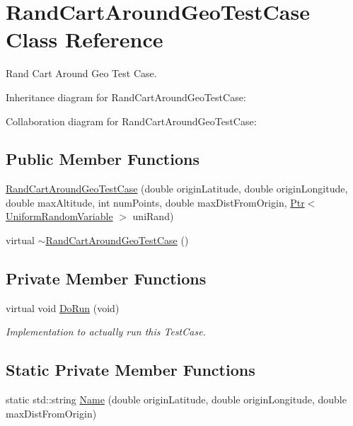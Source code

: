 \hypertarget{classRandCartAroundGeoTestCase}{}\section{Rand\+Cart\+Around\+Geo\+Test\+Case Class Reference}
\label{classRandCartAroundGeoTestCase}


Rand Cart Around Geo Test Case.  




Inheritance diagram for Rand\+Cart\+Around\+Geo\+Test\+Case\+:


Collaboration diagram for Rand\+Cart\+Around\+Geo\+Test\+Case\+:
\subsection*{Public Member Functions}
\begin{DoxyCompactItemize}
\item 
\hyperlink{classRandCartAroundGeoTestCase_ac9eab7c26bb248769d9d781c83065957}{Rand\+Cart\+Around\+Geo\+Test\+Case} (double origin\+Latitude, double origin\+Longitude, double max\+Altitude, int num\+Points, double max\+Dist\+From\+Origin, \hyperlink{classns3_1_1Ptr}{Ptr}$<$ \hyperlink{classns3_1_1UniformRandomVariable}{Uniform\+Random\+Variable} $>$ uni\+Rand)
\item 
virtual \hyperlink{classRandCartAroundGeoTestCase_a6219b54532b742f8b828886475638d53}{$\sim$\+Rand\+Cart\+Around\+Geo\+Test\+Case} ()
\end{DoxyCompactItemize}
\subsection*{Private Member Functions}
\begin{DoxyCompactItemize}
\item 
virtual void \hyperlink{classRandCartAroundGeoTestCase_a7b61135165e1842b0c48485b872d2e12}{Do\+Run} (void)
\begin{DoxyCompactList}\small\item\em Implementation to actually run this Test\+Case. \end{DoxyCompactList}\end{DoxyCompactItemize}
\subsection*{Static Private Member Functions}
\begin{DoxyCompactItemize}
\item 
static std\+::string \hyperlink{classRandCartAroundGeoTestCase_aacc1cd80a717b42f4ea01d3ef9cb1fad}{Name} (double origin\+Latitude, double origin\+Longitude, double max\+Dist\+From\+Origin)
\end{DoxyCompactItemize}
